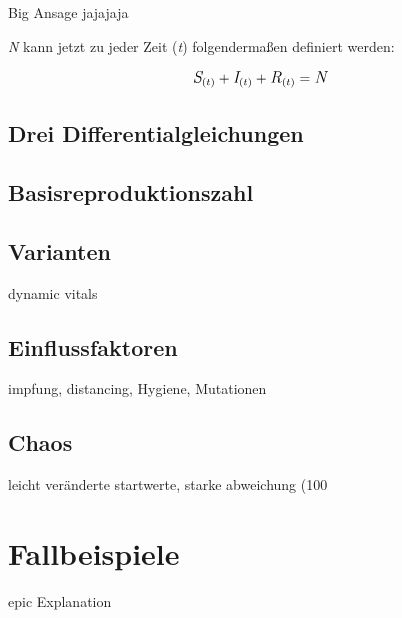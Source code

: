 \documentclass[12pt]{scrartcl} %
\begin{document}
Big Ansage jajajaja

\textit{N} kann jetzt zu jeder Zeit (\textit{t}) folgendermaßen definiert werden: \cite{3}


$$ \large\textit{S}_{(t)} + \textit{I}_{(t)} + \textit{R}_{(t)} = \textit{N}\normalsize $$


\subsection{Drei Differentialgleichungen}


\subsection{Basisreproduktionszahl}


\subsection{Varianten}

dynamic vitals


\subsection{Einflussfaktoren}

impfung, distancing, Hygiene, Mutationen


\subsection{Chaos}

leicht veränderte startwerte, starke abweichung (100%


\newpage
\section{Fallbeispiele}

epic Explanation

\end{document}
